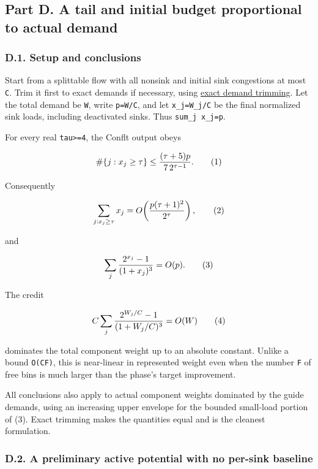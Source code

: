 \hypertarget{af-385fd70686-part-d.-a-tail-and-initial-budget-proportional-to-actual-demand}{%
\subsection{Part D. A tail and initial budget proportional to actual demand}\label{af-385fd70686-part-d.-a-tail-and-initial-budget-proportional-to-actual-demand}}

\hypertarget{af-385fd70686-d.1.-setup-and-conclusions}{%
\subsubsection{D.1. Setup and conclusions}\label{af-385fd70686-d.1.-setup-and-conclusions}}

Start from a splittable flow with all nonsink and initial sink congestions at most \texttt{C}. Trim it first to exact demands if necessary, using \href{https://github.com/icekylinx/algorithm-frontier/blob/main/manuscripts/graph-backends/exact-demand-flow-trimming.md}{exact demand trimming}. Let the total demand be \texttt{W}, write \texttt{p=W/C}, and let \texttt{x\_j=W\_j/C} be the final normalized sink loads, including deactivated sinks. Thus \texttt{sum\_j\ x\_j=p}.

For every real \texttt{tau\textgreater{}=4}, the Conflt output obeys

\[
\#\{j:x_j\ge\tau\}
\le { (\tau+5)p\over 7\,2^{\tau-1}}.             \tag{1}
\]

Consequently

\[
\sum_{j:x_j\ge\tau}x_j
=O\!\left({p(\tau+1)^2\over2^\tau}\right),       \tag{2}
\]

and

\[
\sum_j {2^{x_j}-1\over(1+x_j)^3}=O(p).           \tag{3}
\]

The credit

\[
C\sum_j {2^{W_j/C}-1\over(1+W_j/C)^3}=O(W)       \tag{4}
\]

dominates the total component weight up to an absolute constant. Unlike a bound \texttt{O(CF)}, this is near-linear in represented weight even when the number \texttt{F} of free bins is much larger than the phase's target improvement.

All conclusions also apply to actual component weights dominated by the guide demands, using an increasing upper envelope for the bounded small-load portion of (3). Exact trimming makes the quantities equal and is the cleanest formulation.

\hypertarget{af-385fd70686-d.2.-a-preliminary-active-potential-with-no-per-sink-baseline}{%
\subsubsection{D.2. A preliminary active potential with no per-sink baseline}\label{af-385fd70686-d.2.-a-preliminary-active-potential-with-no-per-sink-baseline}}

